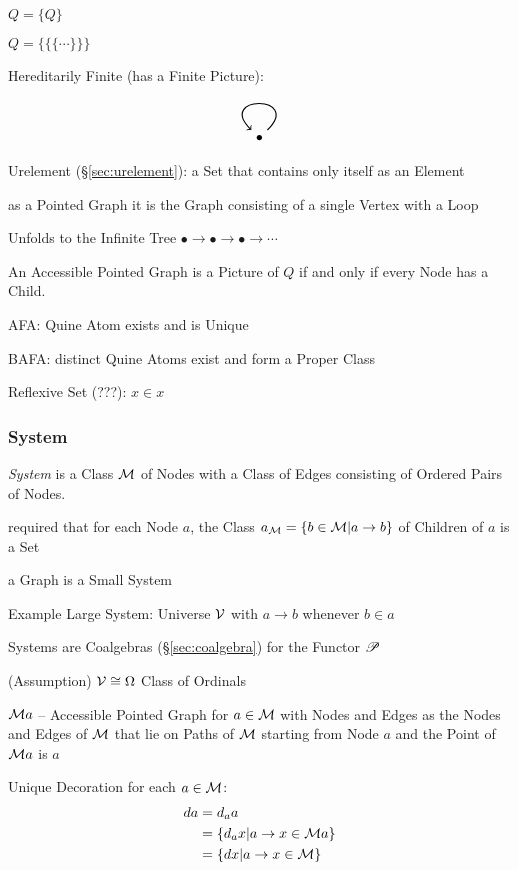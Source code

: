 $Q = \{Q\}$

$Q = \{\{\{\cdots\}\}\}$

Hereditarily Finite (has a Finite Picture):
\[
  \begin{tikzpicture}
    \node (A) {$\bullet$};
    \draw[->,thick,loop] (A) to (A);
  \end{tikzpicture}
\]

Urelement (\S\ref{sec:urelement}): a Set that contains only itself as
an Element

as a Pointed Graph it is the Graph consisting of a single Vertex with
a Loop

Unfolds to the Infinite Tree $\bullet \rightarrow \bullet
\rightarrow \bullet \rightarrow \cdots$

An Accessible Pointed Graph is a Picture of $Q$ if and only if every
Node has a Child. \cite{aczel88}

AFA: Quine Atom exists and is Unique

BAFA: distinct Quine Atoms exist and form a Proper Class

Reflexive Set (???): $x \in x$



\subsubsection{System}\label{sec:system}
\cite{aczel88}

\emph{System} is a Class $\mathcal{M}$ of Nodes with a Class of Edges
consisting of Ordered Pairs of Nodes.

required that for each Node $a$, the Class $a_\mathcal{M} = \{b \in
\mathcal{M} | a \rightarrow b\}$ of Children of $a$ is a Set

a Graph is a Small System

Example Large System: Universe $\mathcal{V}$ with $a \rightarrow b$
whenever $b \in a$

Systems are Coalgebras (\S\ref{sec:coalgebra}) for the Functor $\mathscr{P}$

(Assumption) $\mathcal{V} \cong \Omega$ Class of Ordinals

$\mathcal{M} a$ -- Accessible Pointed Graph for $a \in \mathcal{M}$ with
Nodes and Edges as the Nodes and Edges of $\mathcal{M}$ that lie on
Paths of $\mathcal{M}$ starting from Node $a$ and the Point of
$\mathcal{M} a$ is $a$

Unique Decoration for each $a \in \mathcal{M}$:
\begin{align*}
  d a &= d_a a \\
      &= \{d_a x | a \rightarrow x \in \mathcal{M} a\} \\
      &= \{d x | a \rightarrow x \in \mathcal{M}\}
\end{align*}

